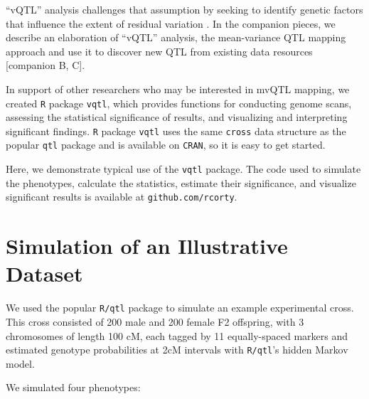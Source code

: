 \documentclass{article}
\begin{document}


``vQTL'' analysis challenges that assumption by seeking to identify genetic factors that influence the extent of residual variation \citep{Ronnegard2011a,Ronnegard2012,Cao2014}.
In the companion pieces, we describe an elaboration of ``vQTL'' analysis, the mean-variance QTL mapping approach and use it to discover new QTL from existing data resources [companion B, C].

In support of other researchers who may be interested in mvQTL mapping, we created \texttt{R} package \texttt{vqtl}, which provides functions for conducting genome scans, assessing the statistical significance of results, and visualizing and interpreting significant findings.
\texttt{R} package \texttt{vqtl} uses the same \texttt{cross} data structure as the popular \texttt{qtl} package and is available on \texttt{CRAN}, so it is easy to get started.

Here, we demonstrate typical use of the \texttt{vqtl} package.
The code used to simulate the phenotypes, calculate the statistics, estimate their significance, and visualize significant results is available at \texttt{github.com/rcorty}.



\section*{Simulation of an Illustrative Dataset}

We used the popular \texttt{R/qtl} package to simulate an example experimental cross.
This cross consisted of 200 male and 200 female F2 offspring, with 3 chromosomes of length 100 cM, each tagged by 11 equally-spaced markers and estimated genotype probabilities at 2cM intervals with \texttt{R/qtl}'s hidden Markov model.

We simulated four phenotypes:
\end{document}
